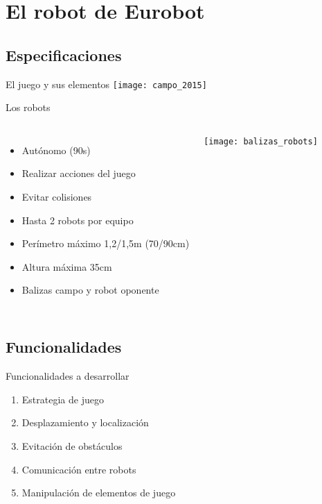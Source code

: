 \documentclass{beamer}
\begin{document}
\section{El robot de Eurobot}
\subsection{Especificaciones}

\begin{frame}{El juego y sus elementos}
\texttt{[image: campo\_2015]}
\end{frame}

\begin{frame}{Los robots}
\begin{columns}

\begin{itemize}
\item Autónomo (90s)
\item Realizar acciones del juego
\item Evitar colisiones
\item Hasta 2 robots por equipo
\item Perímetro máximo 1,2/1,5m (70/90cm)
\item Altura máxima 35cm
\item Balizas campo y robot oponente
\end{itemize}

\centering
\texttt{[image: balizas\_robots]}
\end{columns}
\end{frame}


\subsection{Funcionalidades}

\begin{frame}{Funcionalidades a desarrollar}

\begin{enumerate}
\item<4-> Estrategia de juego
\item<1-> Desplazamiento y localización
\item<2-> Evitación de obstáculos
\item<5-> Comunicación entre robots
\item<3-> Manipulación de elementos de juego
\end{enumerate}

\end{frame}
\end{document}
